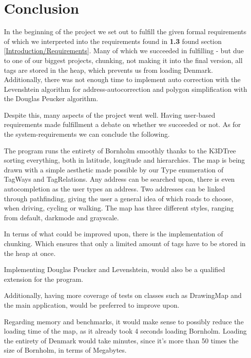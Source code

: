 \section{Conclusion}
In the beginning of the project we set out to fulfill the given formal requirements of which we interpreted into the requirements found in \textbf{1.3} found section \ref{Introduction/Requirements}. Many of which we succeeded in fulfilling - but due to one of our biggest projects, chunking, not making it into the final version, all tags are stored in the heap, which prevents us from loading Denmark. Additionally, there was not enough time to implement auto correction with the Levenshtein algorithm for address-autocorrection and polygon simplification with the Douglas Peucker algorithm.
\par Despite this, many aspects of the project went well. Having user-based requirements made fulfillment a debate on whether we succeeded or not. As for the system-requirements we can conclude the following.
\par The program runs the entirety of Bornholm smoothly thanks to the K3DTree sorting everything, both in latitude, longitude and hierarchies. The map is being drawn with a simple aesthetic made possible by our Type enumeration of TagWays and TagRelations. Any address can be searched upon, there is even autocompletion as the user types an address. Two addresses can be linked through pathfinding, giving the user a general idea of which roads to choose, when driving, cycling or walking. The map has three different styles, ranging from default, darkmode and grayscale.

In terms of what could be improved upon, there is the implementation of chunking. Which ensures that only a limited amount of tags have to be stored in the heap at once. 

Implementing Douglas Peucker and Levenshtein, would also be a qualified extension for the program.

Additionally, having more coverage of tests on classes such as DrawingMap and the main application, would be preferred to improve upon.

Regarding memory and benchmarks, it would make sense to possibly reduce the loading time of the map, as it already took 4 seconds loading Bornholm. Loading the entirety of Denmark would take minutes, since it’s more than 50 times the size of Bornholm, in terms of Megabytes.

